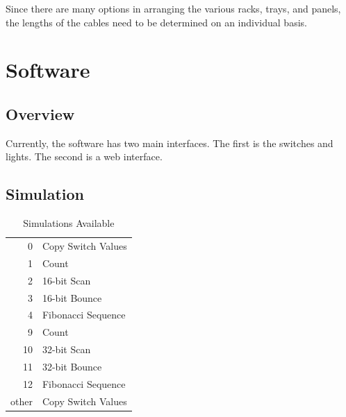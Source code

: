 \documentclass[10pt, openany]{book}
\begin{document}
Since there are many options in arranging the various racks, trays, and panels, the lengths of the cables need to be determined on an individual basis.

\chapter{Software}
\section{Overview}
Currently, the software has two main interfaces.  The first is the switches and lights.  The second is a web interface.

\section{Simulation}

\begin{table}
  \caption{Simulations Available}
  \label{tbl:Simulations}
  \centering
  \begin{tabular}{|r|l|}
    \hline
    0 & Copy Switch Values\\
    1 & Count\\
    2 & 16-bit Scan\\
    3 & 16-bit Bounce\\
    4 & Fibonacci Sequence\\
    9 & Count\\
    10 & 32-bit Scan\\
    11 & 32-bit Bounce\\
    12 & Fibonacci Sequence\\
    \hline
    other & Copy Switch Values\\
    \hline
  \end{tabular}
\end{table}
\end{document}
